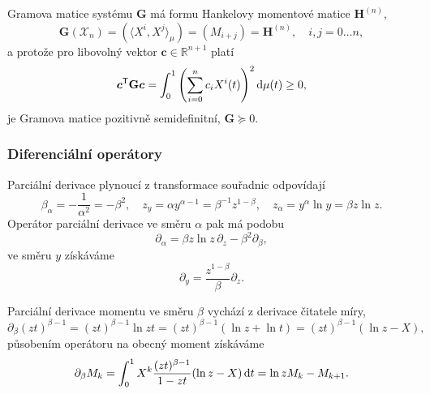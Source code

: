 Gramova matice systému $\mathbf{G}$ má formu Hankelovy momentové matice $\mathbf{H}^{(n)}$,
\begin{equation}
    \mathbf{G}(\mathcal{X}_n)=(\langle X^i,X^j\rangle_\mu)=(M_{i+j})=\mathbf{H}^{(n)}, \quad i,j=0\dots n,
\end{equation}
a protože pro libovolný vektor $\bm{c}\in\mathbb{R}^{n+1}$ platí
\begin{equation}
    \bm{c}^\mathsf{T} \mathbf{G} \bm{c}=\int_0^1\left(\sum_{i=0}^n c_i X^i(t)\right)^2\!\,\mathrm{d}{\mu}(t)\geq0,
\end{equation}
je Gramova matice pozitivně semidefinitní, $\mathbf{G}\succeq 0$.

\subsubsection{Diferenciální operátory}\label{sss:diferencialni_operatory}
Parciální derivace plynoucí z transformace souřadnic odpovídají
\begin{equation}
    \beta_{\alpha}=-\frac{1}{\alpha^2}=-\beta^2,\quad
    z_y=\alpha y^{\alpha-1}=\beta^{-1}z^{1-\beta},\quad
    z_\alpha = y^\alpha\ln y  = \beta z \ln z.
\end{equation}
Operátor parciální derivace ve směru $\alpha$ pak má podobu
\begin{equation}
    \partial_\alpha=\beta z \ln{z}\,\partial_z-\beta^2\partial_\beta,
\end{equation}
ve směru $y$ získáváme
\begin{equation}
    \partial_y=\frac{z^{1-\beta}}{\beta}\partial_z.
\end{equation}

Parciální derivace momentu ve směru $\beta$ vychází z derivace čitatele míry,
\begin{equation}
    \partial_\beta(zt)^{\beta-1}=(zt)^{\beta-1}\ln{zt}=(zt)^{\beta-1}(\ln{z}+\ln{t})=(zt)^{\beta-1}(\ln{z}-X),
\end{equation}
působením operátoru na obecný moment získáváme
\begin{equation}
    \partial_\beta M_k = \int_0^1X^k\frac{(zt)^{\beta-1}}{1-zt}(\ln{z}-X)\,\mathrm{d}{t}=\ln{z}M_k-M_{k+1}.
\end{equation}

